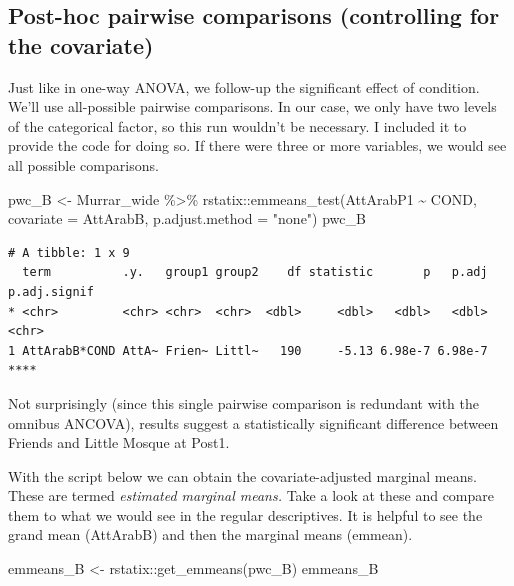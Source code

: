 \documentclass[
  11pt,
]{book}
\newenvironment{Shaded}{\begin{snugshade}}{\end{snugshade}}
\newcommand{\AttributeTok}[1]{\textcolor[rgb]{0.77,0.63,0.00}{#1}}
\newcommand{\FunctionTok}[1]{\textcolor[rgb]{0.00,0.00,0.00}{#1}}
\newcommand{\NormalTok}[1]{#1}
\newcommand{\OtherTok}[1]{\textcolor[rgb]{0.56,0.35,0.01}{#1}}
\newcommand{\SpecialCharTok}[1]{\textcolor[rgb]{0.00,0.00,0.00}{#1}}
\newcommand{\StringTok}[1]{\textcolor[rgb]{0.31,0.60,0.02}{#1}}
\begin{document}
\hypertarget{post-hoc-pairwise-comparisons-controlling-for-the-covariate}{%
\subsection{Post-hoc pairwise comparisons (controlling for the covariate)}\label{post-hoc-pairwise-comparisons-controlling-for-the-covariate}}

Just like in one-way ANOVA, we follow-up the significant effect of condition. We'll use all-possible pairwise comparisons. In our case, we only have two levels of the categorical factor, so this run wouldn't be necessary. I included it to provide the code for doing so. If there were three or more variables, we would see all possible comparisons.

\begin{Shaded}
\begin{Highlighting}[]
\NormalTok{pwc\_B }\OtherTok{\textless{}{-}}\NormalTok{ Murrar\_wide }\SpecialCharTok{\%\textgreater{}\%}
\NormalTok{    rstatix}\SpecialCharTok{::}\FunctionTok{emmeans\_test}\NormalTok{(AttArabP1 }\SpecialCharTok{\textasciitilde{}}\NormalTok{ COND, }\AttributeTok{covariate =}\NormalTok{ AttArabB, }\AttributeTok{p.adjust.method =} \StringTok{"none"}\NormalTok{)}
\NormalTok{pwc\_B}
\end{Highlighting}
\end{Shaded}

\begin{verbatim}
# A tibble: 1 x 9
  term          .y.   group1 group2    df statistic       p   p.adj p.adj.signif
* <chr>         <chr> <chr>  <chr>  <dbl>     <dbl>   <dbl>   <dbl> <chr>       
1 AttArabB*COND AttA~ Frien~ Littl~   190     -5.13 6.98e-7 6.98e-7 ****        
\end{verbatim}

Not surprisingly (since this single pairwise comparison is redundant with the omnibus ANCOVA), results suggest a statistically significant difference between Friends and Little Mosque at Post1.

With the script below we can obtain the covariate-adjusted marginal means. These are termed \emph{estimated marginal means.} Take a look at these and compare them to what we would see in the regular descriptives. It is helpful to see the grand mean (AttArabB) and then the marginal means (emmean).

\begin{Shaded}
\begin{Highlighting}[]
\NormalTok{emmeans\_B }\OtherTok{\textless{}{-}}\NormalTok{ rstatix}\SpecialCharTok{::}\FunctionTok{get\_emmeans}\NormalTok{(pwc\_B)}
\NormalTok{emmeans\_B}
\end{Highlighting}
\end{Shaded}
\end{document}
